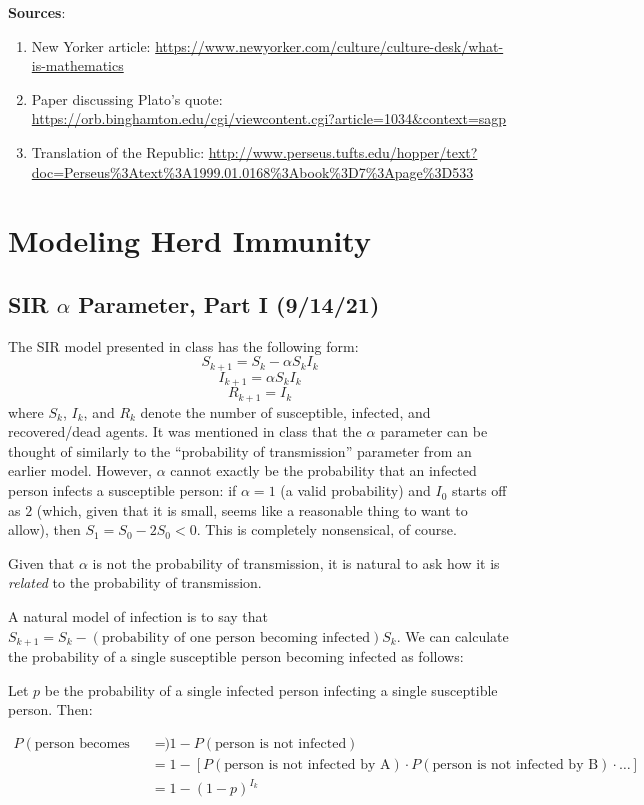 \documentclass[12pt]{article}
\begin{document}
\textbf{Sources}:
\begin{enumerate}
    \item New Yorker article: \url{https://www.newyorker.com/culture/culture-desk/what-is-mathematics}
    \item Paper discussing Plato's quote: \url{https://orb.binghamton.edu/cgi/viewcontent.cgi?article=1034&context=sagp}
    \item Translation of the Republic: \url{http://www.perseus.tufts.edu/hopper/text?doc=Perseus%3Atext%3A1999.01.0168%3Abook%3D7%3Apage%3D533}
\end{enumerate}

\newpage

\section{Modeling Herd Immunity}
\subsection{SIR $\alpha$ Parameter, Part I (9/14/21)}
The SIR model presented in class has the following form:
$$S_{k+1} = S_k - \alpha S_k I_k$$
$$I_{k+1} = \alpha S_k I_k$$
$$R_{k+1} = I_k$$
where $S_k$, $I_k$, and $R_k$ denote the number of susceptible, infected, and recovered/dead agents. It was mentioned in class that the $\alpha$ parameter can be thought of similarly to the ``probability of transmission'' parameter from an earlier model.  However, $\alpha$ cannot exactly be the probability that an infected person infects a susceptible person: if $\alpha = 1$ (a valid probability) and $I_0$ starts off as $2$ (which, given that it is small, seems like a reasonable thing to want to allow), then $S_{1} = S_0 - 2 S_0 < 0$. This is completely nonsensical, of course.

Given that $\alpha$ is not the probability of transmission, it is natural to ask how it is \textit{related} to the probability of transmission. 

A natural model of infection is to say that $S_{k+1} = S_{k} - (\text{probability of one person becoming infected}) S_{k}$. We can calculate the probability of a single susceptible person becoming infected as follows:

Let $p$ be the probability of a single infected person infecting a single susceptible person. Then:

\begin{align*}
P(\text{person becomes infected}) &= 1 - P(\text{person is not infected})\\
&= 1 - [P(\text{person is not infected by A}) \cdot P(\text{person is not infected by B}) \cdot \hdots]\\
&= 1 - (1-p)^{I_k}
\end{align*}
\end{document}
